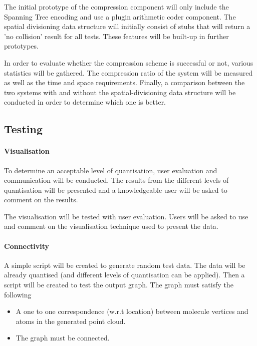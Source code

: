 \documentclass[a4paper,twocolumn]{article}
\begin{document}
The initial prototype of the compression component will only include the
Spanning Tree encoding and use a plugin arithmetic coder component. The
spatial divisioning data structure will initially consist of stubs that will
return a 'no collision' result for all tests. These features will be built-up
in further prototypes.


In order to evaluate whether the compression scheme is successful or not,
various statistics will be gathered. The compression ratio of the system will
be measured as well as the time and space requirements. Finally, a comparison
between the two systems with and without the spatial-divisioning data
structure will be conducted in order to determine which one is better.



\subsection{Testing}

\paragraph{Visualisation}
To determine an acceptable level of quantisation, user evaluation and
communication will be conducted. The results from the different levels of
quantisation will be presented and a knowledgeable user will be asked to
comment on the results.

The visualisation will be tested with user evaluation. Users will be asked to
use and comment on the visualisation technique used to present the data.

\paragraph{Connectivity}
A simple script will be created to generate random test data. The data will be
already quantised (and different levels of quantisation can be applied). Then
a script will be created to test the output graph. The graph must satisfy the
following
\begin{itemize}
\item A one to one correspondence (w.r.t location) between molecule vertices
 and atoms in the generated point cloud.
\item The graph must be connected.
\end{itemize}
\end{document}
